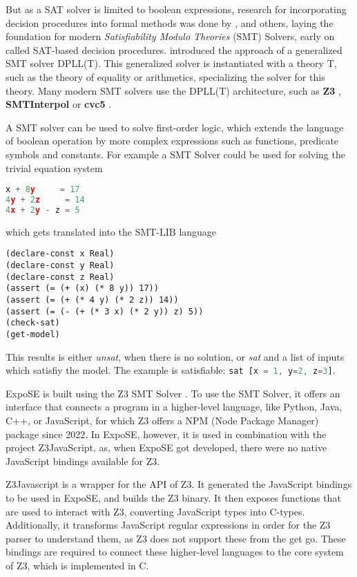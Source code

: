 But as a SAT solver is limited to boolean expressions, research for incorporating decision procedures into formal methods was done by \citet{shostak_algorithm_1978}, \citet{boyer_integrating_1988-1} and others, laying the foundation for modern \textit{Satisfiability Modulo Theories}  (SMT) Solvers, early on called SAT-based decision procedures. \citet{nieuwenhuis_solving_2006} introduced the approach of a generalized SMT solver DPLL(T). This generalized solver is instantiated with a theory T, such as the theory of equality or arithmetics, specializing the solver for this theory.
Many modern SMT solvers use the DPLL(T) architecture, such as \textbf{Z3}  \cite{de_moura_z3_2008}, \textbf{SMTInterpol} \cite{hutchison_smtinterpol_2012} or \textbf{cvc5} \cite{barbosa_cvc5_2022}.


A SMT solver can be used to solve first-order logic, which extends the language of boolean operation by more complex expressions such as functions, predicate symbols and constants. 
For example a SMT Solver could be used for solving the trivial equation system
\begin{lstlisting}[language=JavaScript]
 x + 8y     = 17
4y + 2z     = 14
4x + 2y - z = 5
\end{lstlisting}
which gets translated into the SMT-LIB language \cite{barrett_smt-lib_2025}
\begin{lstlisting}
(declare-const x Real)
(declare-const y Real)
(declare-const z Real)
(assert (= (+ (x) (* 8 y)) 17))
(assert (= (+ (* 4 y) (* 2 z)) 14))
(assert (= (- (+ (* 3 x) (* 2 y)) z) 5))
(check-sat)
(get-model)
\end{lstlisting}
This results is either \textit{unsat}, when there is no solution, or \textit{sat} and a list of inputs which satisfiy the model. The example is satisfiable: \lstinline[language=JavaScript]+sat [x = 1, y=2, z=3]+. 


ExpoSE is built using the Z3 SMT Solver \cite{de_moura_z3_2008}. 
To use the SMT Solver, it offers an interface that connects a program in a higher-level language, like Python, Java, C++, or JavaScript, for which Z3 offers a NPM (Node Package Manager) package since 2022. In ExpoSE, however, it is used in combination with the project Z3JavaScript, as, when ExpoSE got developed, there were no native JavaScript bindings available for Z3. 

Z3Javascript is a wrapper for the API of Z3. It generated the JavaScript bindings to be used in ExpoSE, and builds the Z3 binary. It then exposes functions that are used to interact with Z3, converting JavaScript types into C-types. Additionally, it transforms JavaScript regular expressions in order for the Z3 parser to understand them, as Z3 does not support these from the get go. These bindings are required to connect these higher-level languages to the core system of Z3, which is implemented in C.

